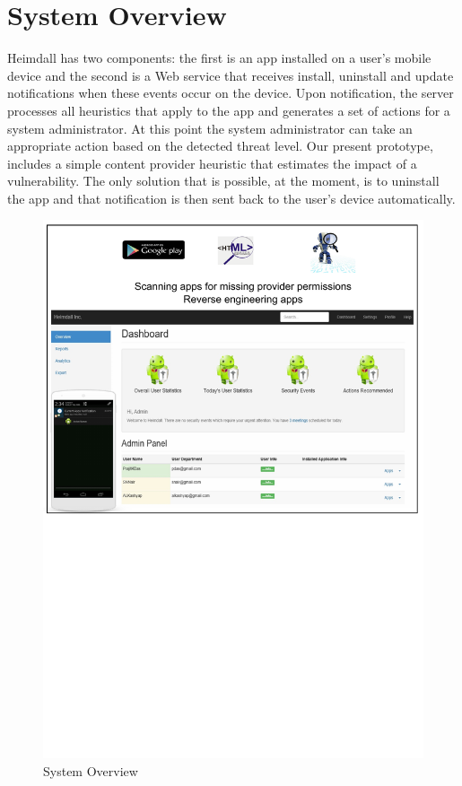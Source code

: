 \section{System Overview}
\label{overview}
\noindent
Heimdall has two components: the first is an app installed on a user's mobile device and the second is a Web service that receives install, uninstall and update notifications when these events occur on the device. Upon notification, the server processes all heuristics that apply to the app and generates a set of actions for a system administrator. At this point the system administrator can take an appropriate action based on the detected threat level. Our present prototype, includes a simple content provider heuristic that estimates the impact of a vulnerability. The only solution that is possible, at the moment, is to uninstall the app and that notification is then sent back to the user's device automatically.

\begin{figure}[tb]
	\centering
	\includegraphics[width=\columnwidth]{images/architecture}
	\caption{System Overview}
	\label{fig:arch}
\end{figure}

